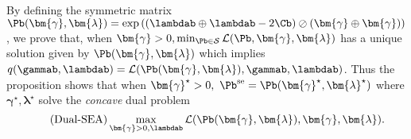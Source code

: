 By defining the symmetric matrix $\Pb(\bm{\gamma}, \bm{\lambda}) = 
\exp{\left(\left(\lambdab \oplus \lambdab - 2 \Cb \right) \oslash \left(\bm{\gamma} \oplus \bm{\gamma} \right) \right)}$, we prove that, when $\bm{\gamma}>0, \min_{\Pb \in \mathcal{S}} \mathcal{L}(\Pb, \bm{\gamma}, \bm{\lambda})$ has a unique solution given by $\Pb(\bm{\gamma}, \bm{\lambda})$ which implies $q(\gammab, \lambdab) = \mathcal{L}(\Pb(\bm{\gamma}, \bm{\lambda}), \gammab, \lambdab)$. Thus the proposition shows that when $\bm{\gamma}^\star > 0, \ \Pb^{\mathrm{se}} = \Pb(\bm{\gamma}^\star, \bm{\lambda}^\star)$ where $\bm{\gamma}^\star, \bm{\lambda}^\star$ solve the \emph{concave} dual problem 
\begin{equation}
\label{eq:dual_problem}
\tag{Dual-SEA}
\max_{\bm{\gamma} > 0, \lambdab} \mathcal{L}(\Pb(\bm{\gamma}, \bm{\lambda}), \bm{\gamma}, \bm{\lambda}). 
\end{equation}

